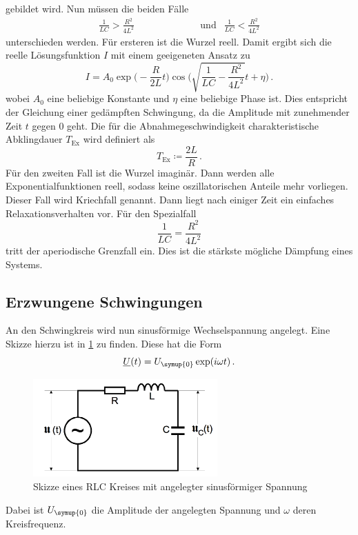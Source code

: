 gebildet wird. Nun müssen die beiden Fälle
\begin{align}
  \frac{1}{LC}>\frac{R^2}{4L^2} & \qquad\qquad\qquad\text{und} & \frac{1}{LC}<\frac{R^2}{4L^2}
\end{align}
unterschieden werden. Für ersteren ist die Wurzel reell. Damit ergibt sich die
reelle Lösungsfunktion $I$ mit einem geeigeneten Ansatz zu
\begin{equation}
  I=A_{\text{0}}\exp\biggl(-\frac{R}{2L}t\biggr)\cos\Biggl(
  \sqrt{\frac{1}{LC}-\frac{R^2}{4L^2}}t+\eta\Biggr)\,.
\end{equation}
wobei $A_{\text{0}}$ eine beliebige Konstante und $\eta$ eine beliebige Phase ist.
Dies entspricht der Gleichung einer gedämpften Schwingung, da die Amplitude mit zunehmender
Zeit $t$ gegen $0$ geht.
Die für die Abnahmegeschwindigkeit charakteristische Abklingdauer $T_{\text{Ex}}$
wird definiert als
\begin{equation}
  T_{\text{Ex}}\coloneq\frac{2L}{R} \,.
  \label{eqn:abklingdauer}
\end{equation}
Für den zweiten Fall ist die Wurzel imaginär. Dann werden alle Exponentialfunktionen
reell, sodass keine oszillatorischen Anteile mehr vorliegen. Dieser Fall wird
Kriechfall genannt. Dann liegt nach einiger Zeit ein einfaches Relaxationsverhalten
vor. Für den Spezialfall
\begin{equation}
  \frac{1}{LC}=\frac{R^2}{4L^2}
\end{equation}
tritt der aperiodische Grenzfall ein. Dies ist die stärkste mögliche Dämpfung eines
Systems.

\subsection{Erzwungene Schwingungen}
\label{Erzwungene_Schwingungen}

An den Schwingkreis wird nun sinusförmige Wechselspannung angelegt. Eine Skizze
hierzu ist in \ref{fig:RLC_sinus} zu finden. Diese hat die Form
\begin{equation}
  \underline{U}(t)=U_{\symup{0}}\exp(i\omega t) \,.
\end{equation}

\begin{figure}
  \centering
  \includegraphics[width=200pt]{data/angeregter_schwingkreis_theorie.png}
  \caption{Skizze eines RLC Kreises mit angelegter sinusförmiger Spannung
  \cite{Versuchsanleitung1}}
  \label{fig:RLC_sinus}
\end{figure}
Dabei ist $U_{\symup{0}}$ die Amplitude der angelegten Spannung und $\omega$ deren
Kreisfrequenz.

